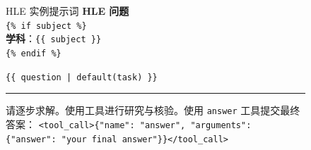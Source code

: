 \begin{figure}[!htbp]
\begin{paperbox}{HLE 实例提示词}
\textbf{HLE 问题} \\
\texttt{\{\% if subject \%\}} \\
\textbf{学科}：\texttt{\{\{ subject \}\}} \\
\texttt{\{\% endif \%\}}

\vspace{0.2cm}
\texttt{\{\{ question | default(task) \}\}}

\vspace{0.2cm}
\hrule
\vspace{0.2cm}

请逐步求解。使用工具进行研究与核验。使用 \texttt{answer} 工具提交最终答案：
\texttt{<tool\_call>\{"name": "answer", "arguments": \{"answer": "your final answer"\}\}</tool\_call>}
\end{paperbox}
\end{figure}
